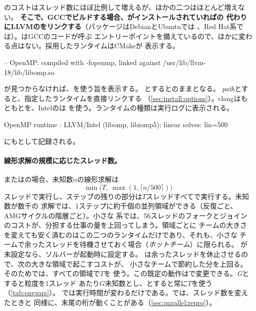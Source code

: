 のコストはスレッド数にほぼ比例して増えるが、ほかの二つはほとんど増えない。
\textbf{そこで、GCCでビルドする場合、がインストールされていればの
代わりにLLVMのをリンクする}（パッケージはDebianとUbuntuでは
、Red Hat系では）。はGCCのコードが呼ぶ
エントリーポイントを備えているので、ほかに変わる点はない。採用したランタイムはCMakeが
表示する。
\begin{shell}
-- OpenMP: compiled with -fopenmp, linked against /usr/lib/llvm-18/lib/libomp.so
\end{shell}
が見つからなければ、を使う旨を表示する。
とするとのままとなる。
\textit{path}とすると、指定したランタイムを直接リンクする
（\cref{sec:install:options}）。clangはもともとを、Intelのは
を使う。ランタイムの種類は実行ログに表示される。
\begin{shell}
 OpenMP runtime  : LLVM/Intel (libomp, libiomp5); linear solves: lin=500
\end{shell}
にもとして記録される。

\paragraph{線形求解の規模に応じたスレッド数。}
またはの場合、未知数$n$の線形求解は
\[
  \min\bigl(T,\ \max(1, \lceil n / 500 \rceil)\bigr)
\]
スレッドで実行し、ステップの残りの部分は$T$スレッドすべてで実行する。未知数が数千の
求解では、1ステップに約千個の並列領域ができる（反復ごと、AMGサイクルの階層ごと）。小さな
系では、56スレッドのフォークとジョインのコストが、分担する仕事の量を上回ってしまう。領域ごとに
チームの大きさを変えても安く済むのはこの二つのランタイムだけであり、それも、小さな
チームで余ったスレッドを待機させておく場合（\emph{ホットチーム}）に限られる。
が未設定なら、ソルバーが起動時に設定する。
は余ったスレッドを休止させるので、次の大きな領域で起こすコストが、
小さなチームで節約した分を上回る。そのためでは、すべての領域で$T$を
使う。この既定の動作はで変更できる。\textit{G}とすると粒度を1スレッド
あたり$G$未知数とし、とすると常に$T$を使う（\cref{tab:envvars}）。
では実行時間が変わるだけである。では、スレッド数を変えたときと
同様に、末尾の桁が動くことがある（\cref{sec:parallel:repro}）。

